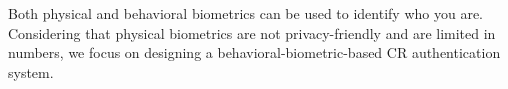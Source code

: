 Both physical and behavioral biometrics can be used to identify who you are. Considering that physical biometrics are not privacy-friendly and are limited in numbers, we focus on designing a behavioral-biometric-based CR authentication system.
